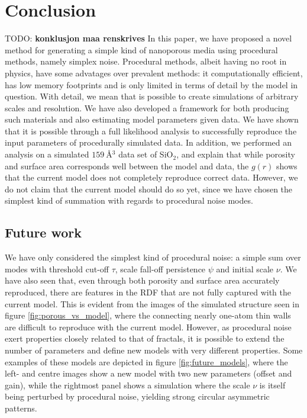 \documentclass[aps,pre,twocolumn,letterpaper,floatfix,showpacs]{revtex4}
\newcommand{\todo}[1]{ {\color{Magenta} TODO: \color{Blue} \textbf{#1} }}
\begin{document}
\section{Conclusion}
\todo{konklusjon maa renskrives}
In this paper, we have proposed a novel method for generating a simple kind of nanoporous media using procedural methods, namely simplex noise. Procedural methods, albeit having no root in physics, have some advatages over prevalent methods: it computationally efficient, has low memory footprints and is only limited in terms of detail by the model in question. With detail, we mean that is possible to create simulations of arbitrary scales and resolution. We have also developed a framework for both producing such materials and also estimating model parameters given data. We have shown that it is possible through a full likelihood analysis to successfully reproduce the input parameters of procedurally simulated data. In addition, we performed an analysis on a simulated $\SI{159}{\angstrom^{3}}$ data set of SiO$_2$, and explain that while porosity and surface area corresponds well between the model and data, the $g(r)$ shows that the current model does not completely reproduce correct data. However, we do not claim that the current model should do so yet, since we have chosen the simplest kind of summation with regards to procedural noise modes. 

\subsection{Future work}
We have only considered the simplest kind of procedural noise: a simple sum over modes with threshold cut-off $\tau$, scale fall-off persistence $\psi$ and initial scale $\nu$. We have also seen that, even through both porosity and surface area accurately reproduced, there are features in the RDF that are not fully captured with the current model. This is evident from the images of the simulated structure seen in figure \ref{fig:porous_vs_model}, where the connecting nearly one-atom thin walls are difficult to reproduce with the current model. However, as procedural noise exert properties closely related to that of fractals, it is possible to extend the number of parameters and define new models with very different properties. Some examples of these models are depicted in figure \ref{fig:future_models}, where the left- and centre images show a new model with two new parameters (offset and gain), while the rightmost panel shows a simulation where the scale $\nu$ is itself being perturbed by procedural noise, yielding strong circular asymmetric patterns.   
\end{document}
